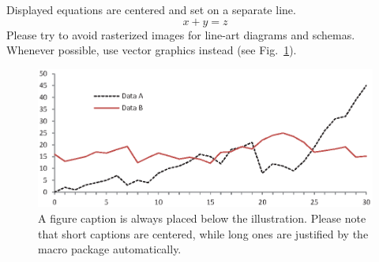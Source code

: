 \documentclass[runningheads]{llncs}
\begin{document}
\noindent Displayed equations are centered and set on a separate
line.
\begin{equation}
x + y = z
\end{equation}
Please try to avoid rasterized images for line-art diagrams and
schemas. Whenever possible, use vector graphics instead (see
Fig.~\ref{fig1}).

\begin{figure}
\includegraphics[width=\textwidth]{fig1.eps}
\caption{A figure caption is always placed below the illustration.
Please note that short captions are centered, while long ones are
justified by the macro package automatically.} \label{fig1}
\end{figure}
\end{document}
